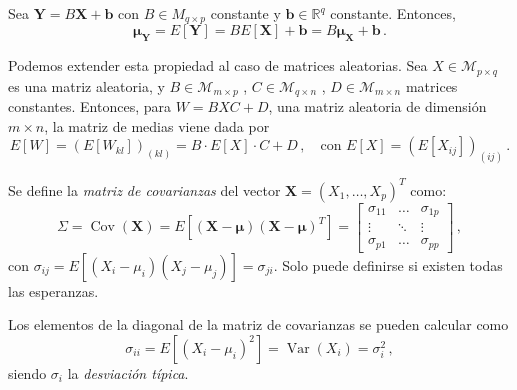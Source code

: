\begin{nprop}
  Sea $\boldsymbol Y = B\boldsymbol X + \boldsymbol b$ con $B \in M_{q\times p}$ constante y $\boldsymbol b \in \mathbb R^q$ constante. Entonces,
  \[
    \boldsymbol \mu_{\boldsymbol Y} = E[\boldsymbol Y] = BE[\boldsymbol X] + \boldsymbol b = B\boldsymbol \mu_{\boldsymbol X} + \boldsymbol b\,.
\]
\end{nprop}

Podemos extender esta propiedad al caso de matrices aleatorias. Sea $X\in \mathcal M_{p\times q}$ es una matriz aleatoria, y $B\in \mathcal M_{m\times p}$ , $C \in \mathcal M_{q\times n}$ , $D \in \mathcal M_{m \times n}$ matrices constantes. Entonces, para $W = BXC + D$, una matriz aleatoria de dimensión $m\times n$, la matriz de medias viene dada por
\[
E[W] = \left(E[W_{kl}]\right)_{(kl)} = B \cdot E[X] \cdot C + D\,, \quad \text{con } E[X] = \left(E[X_{ij}]\right)_{(ij)}\,.
\]

\begin{ndef}
  Se define la \emph{matriz de covarianzas} del vector $\boldsymbol X = (X_1,\dots,X_p)^T$ como:
  \[
\Sigma = \operatorname{Cov}(\boldsymbol X) = E\left[(\boldsymbol X-\boldsymbol \mu)(\boldsymbol X-\boldsymbol \mu)^T\right] = \begin{bmatrix} \sigma_{11} & \dots & \sigma_{1p} \\ \vdots& \ddots & \vdots \\ \sigma_{p1} &  \dots & \sigma_{pp}\end{bmatrix}\,,
\]
con $\sigma_{ij} = E\left[(X_i - \mu_i)(X_j - \mu_j)\right] = \sigma_{ji}$. Solo puede definirse si existen todas las esperanzas. 
\end{ndef}

\begin{nota}
  Los elementos de la diagonal de la matriz de covarianzas se pueden calcular como \[\sigma_{ii}=E\left[(X_i - \mu_i)^2\right] = \operatorname{Var}(X_i) = \sigma_i^2\,,\]siendo $\sigma_i$ la \emph{desviación típica}.
\end{nota}

